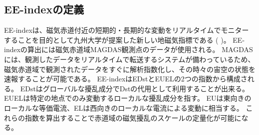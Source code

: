 \subsection{EE-indexの定義}
EE-indexは、磁気赤道付近の短期的・長期的な変動をリアルタイムでモニターすることを目的として九州大学が提案した新しい地磁気指標である (\citeauthor{Uozumi2008} \citeyear{Uozumi2008})。
EE-indexの算出には磁気赤道域MAGDAS観測点のデータが使用される。
MAGDASには、観測したデータをリアルタイムで転送するシステムが備わっているため、磁気赤道域で観測されたデータをすぐに解析指数化し、その時々の宙空の状態を速報することが可能である。
EE-indexはEDstとEUELの2つの指数から構成される。
EDstはグローバルな擾乱成分でDstの代用として利用することが出来る。
EUELは特定の地点でのみ変動するローカルな擾乱成分を指す。
EUは東向きのローカルな等価電流、ELは西向きのローカルな電流による変動に相当する。
これらの指数を算出することで赤道域の磁気擾乱のスケールの定量化が可能になる。
